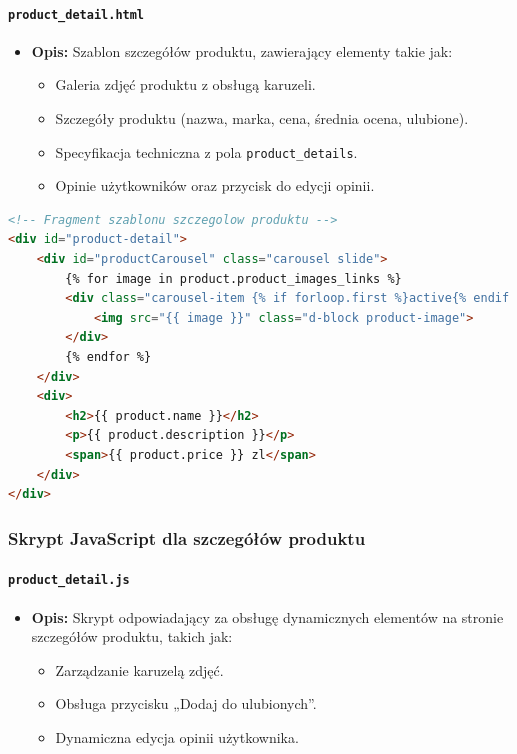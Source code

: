 \documentclass[12pt,a4paper,oneside]{article}
\theoremstyle{definition}
\numberwithin{equation}{section}
\begin{document}
\paragraph{\texttt{product\_detail.html}}
\begin{itemize}
    \item \textbf{Opis:} Szablon szczegółów produktu, zawierający elementy takie jak:
    \begin{itemize}
        \item Galeria zdjęć produktu z obsługą karuzeli.
        \item Szczegóły produktu (nazwa, marka, cena, średnia ocena, ulubione).
        \item Specyfikacja techniczna z pola \texttt{product\_details}.
        \item Opinie użytkowników oraz przycisk do edycji opinii.
    \end{itemize}
\end{itemize}

\begin{lstlisting}[language=HTML, caption=Szablon product\_detail.html]
<!-- Fragment szablonu szczegolow produktu -->
<div id="product-detail">
    <div id="productCarousel" class="carousel slide">
        {% for image in product.product_images_links %}
        <div class="carousel-item {% if forloop.first %}active{% endif %}">
            <img src="{{ image }}" class="d-block product-image">
        </div>
        {% endfor %}
    </div>
    <div>
        <h2>{{ product.name }}</h2>
        <p>{{ product.description }}</p>
        <span>{{ product.price }} zl</span>
    </div>
</div>
\end{lstlisting}

\subsubsection*{Skrypt JavaScript dla szczegółów produktu}

\paragraph{\texttt{product\_detail.js}}
\begin{itemize}
    \item \textbf{Opis:} Skrypt odpowiadający za obsługę dynamicznych elementów na stronie szczegółów produktu, takich jak:
    \begin{itemize}
        \item Zarządzanie karuzelą zdjęć.
        \item Obsługa przycisku „Dodaj do ulubionych”.
        \item Dynamiczna edycja opinii użytkownika.
    \end{itemize}
\end{itemize}
\end{document}

